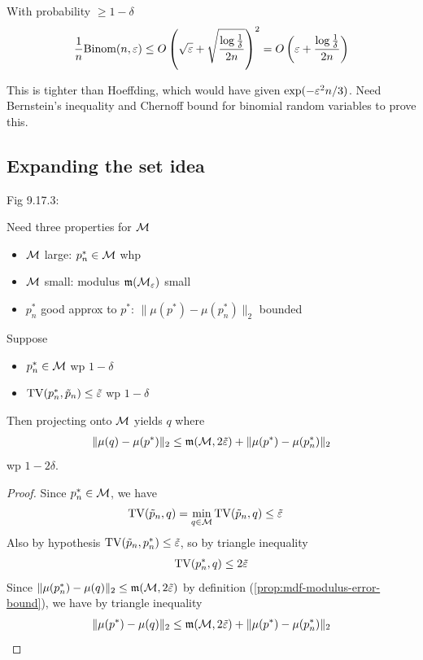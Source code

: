 \begin{lemma}
  With probability $\geq 1 - \delta$
  \begin{align}
    \frac{1}{n} \text{Binom}(n, \varepsilon)
    \leq O\left(\sqrt{\varepsilon} + \sqrt{\frac{\log \frac{1}{\delta}}{2 n}}\right)^2
    = O\left(\varepsilon + \frac{\log \frac{1}{\delta}}{2 n}\right)
  \end{align}
\end{lemma}

\begin{remark}
  This is tighter than Hoeffding, which would have given $\exp(-\varepsilon^2 n / 3)$.
  Need Bernstein's inequality and Chernoff bound for binomial random variables
  to prove this.
\end{remark}

\subsection{Expanding the set idea}%

Fig 9.17.3:

Need three properties for $\mathcal{M}$
\begin{itemize}
  \item $\mathcal{M}$ large: $p_n^* \in \mathcal{M}$ whp
  \item $\mathcal{M}$ small: modulus $\mathfrak{m}(\mathcal{M}_{\varepsilon})$ small
  \item $p_n^*$ good approx to $p^*$: $\|\mu(p^*) - \mu(p_n^*)\|_2$ bounded
\end{itemize}

\begin{proposition}\label{prop:projection-bound-expand-G-to-M}
  Suppose
  \begin{itemize}
    \item $p^*_n \in \mathcal{M}$ wp $1 - \delta$
    \item $\operatorname{TV}(p_n^*, \tilde{p}_n) \leq \tilde{\varepsilon}$ wp $1 - \delta$
  \end{itemize}
  Then projecting onto $\mathcal{M}$ yields $q$ where
  \begin{align}
    \|\mu(q) - \mu(p^*)\|_2 \leq \mathfrak{m}(\mathcal{M}, 2 \tilde{\varepsilon}) + \|\mu(p^*) - \mu(p_n^*)\|_2
  \end{align}
  wp $1 - 2 \delta$.
\end{proposition}

\begin{proof}
  Since $p_n^* \in \mathcal{M}$, we have
  \begin{align}
    \operatorname{TV}(\tilde{p}_n, q) &= \min_{q \in \mathcal{M}} \operatorname{TV}(\tilde{p}_n, q) \leq \tilde{\varepsilon}
  \end{align}
  Also by hypothesis $\operatorname{TV}(\tilde{p}_n, p_n^*) \leq \tilde{\varepsilon}$, so
  by triangle inequality
  \begin{align}
    \operatorname{TV}(p_n^*, q) \leq 2 \tilde{\varepsilon}
  \end{align}
  Since $\|\mu(p_n^*) - \mu(q)\|_2 \leq \mathfrak{m}(\mathcal{M}, 2\tilde{\varepsilon})$ by definition
  (\cref{prop:mdf-modulus-error-bound}), we have
  by triangle inequality
  \begin{align}
    \|\mu(p^*) - \mu(q)\|_2 \leq \mathfrak{m}(\mathcal{M}, 2 \tilde{\varepsilon}) + \|\mu(p^*) - \mu(p_n^*)\|_2
  \end{align}
\end{proof}

